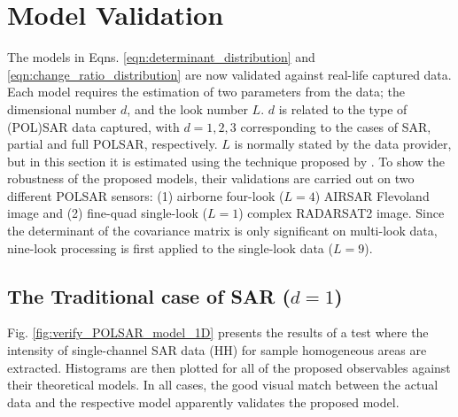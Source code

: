 \documentclass[printer]{tRSL2e}
\begin{document}

\section{Model Validation}
\label{sec:polsar_models_validation}

The models in Eqns. \ref{eqn:determinant_distribution} and \ref{eqn:change_ratio_distribution} are now validated against real-life captured data.
Each model requires the estimation of two parameters from the data; 
the dimensional number $d$, and  the look number $L$.
$d$ is related to the type of (POL)SAR data captured,
  with $d=1,2,3$ corresponding to the cases of SAR, partial and full POLSAR, respectively.
$L$ is normally stated by the data provider,
  but in this section it is estimated using the technique proposed by \citet{Anfinsen_2009_TGRS_3795}.
To show the robustness of the proposed models, 
  their validations are carried out on two different POLSAR sensors: (1) airborne four-look ($L=4$) AIRSAR Flevoland image and (2)
fine-quad single-look ($L=1$) complex RADARSAT2 image.
Since the determinant of the covariance matrix is only significant on multi-look data,
  nine-look processing is first applied to the single-look data ($L=9$).

\subsection{The Traditional case of SAR ($d=1$)}

Fig. \ref{fig:verify_POLSAR_model_1D} presents the results of a test where the intensity of single-channel SAR data (HH) for sample homogeneous areas are extracted.
Histograms are then plotted for all of the proposed observables %
against their theoretical models.
In all cases, the good visual match between the actual data and the respective model apparently validates the proposed model. %
\end{document}

